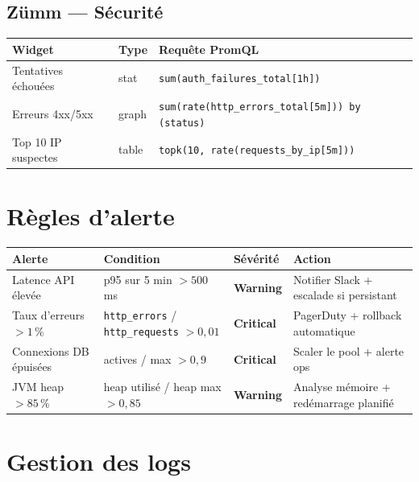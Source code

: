 \subsection{Zümm --- Sécurité}

\begin{center}
\small
\begin{tabular}{llp{7.6cm}}
\toprule
\textbf{Widget} & \textbf{Type} & \textbf{Requête PromQL} \\
\midrule
Tentatives échouées   & stat  & \texttt{sum(auth\_failures\_total[1h])} \\
Erreurs 4xx/5xx       & graph & \texttt{sum(rate(http\_errors\_total[5m])) by (status)} \\
Top 10 IP suspectes   & table & \texttt{topk(10, rate(requests\_by\_ip[5m]))} \\
\bottomrule
\end{tabular}
\end{center}

\section{Règles d'alerte}

\begin{center}
\small
\begin{tabular}{lp{5.6cm}lp{4.4cm}}
\toprule
\textbf{Alerte} & \textbf{Condition} & \textbf{Sévérité} & \textbf{Action} \\
\midrule
Latence API élevée &
  p95 sur 5 min $> 500$ ms &
  \textcolor{miel}{\textbf{Warning}} &
  Notifier Slack + escalade si persistant \\
\addlinespace
Taux d'erreurs $> 1\,\%$ &
  \texttt{http\_errors} / \texttt{http\_requests} $> 0{,}01$ &
  \textcolor{red!70!black}{\textbf{Critical}} &
  PagerDuty + rollback automatique \\
\addlinespace
Connexions DB épuisées &
  actives / max $> 0{,}9$ &
  \textcolor{red!70!black}{\textbf{Critical}} &
  Scaler le pool + alerte ops \\
\addlinespace
JVM heap $> 85\,\%$ &
  heap utilisé / heap max $> 0{,}85$ &
  \textcolor{miel}{\textbf{Warning}} &
  Analyse mémoire + redémarrage planifié \\
\bottomrule
\end{tabular}
\end{center}

\section{Gestion des logs}

